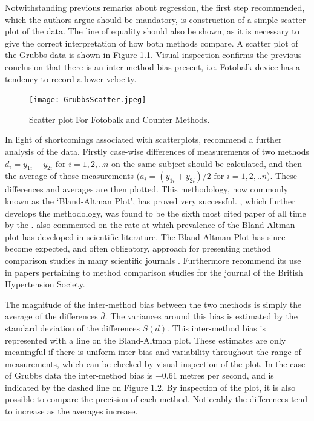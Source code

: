 \documentclass[12pt, a4paper]{report}
\begin{document}
Notwithstanding previous remarks about regression, the first step
recommended, which the authors argue should be mandatory, is
construction of a simple scatter plot of the data. The line of
equality should also be shown, as it is necessary to give the
correct interpretation of how both methods compare. A scatter plot
of the Grubbs data is shown in Figure 1.1. Visual inspection confirms the previous conclusion that there is an
inter-method bias present, i.e. Fotobalk device has a tendency to
record a lower velocity.

\begin{figure}[h!]
\begin{center}
  \texttt{[image: GrubbsScatter.jpeg]}
  \caption{Scatter plot For Fotobalk and Counter Methods.}\label{GrubbsScatter}
\end{center}
\end{figure}

In light of shortcomings associated with scatterplots,
\citet*{BA83} recommend a further analysis of the data. Firstly
case-wise differences of measurements of two methods $d_{i} =
y_{1i}-y_{2i} \mbox{ for }i=1,2,..n$ on the same subject should be
calculated, and then the average of those measurements ($a_{i} =
(y_{1i} + y_{2i})/2 \mbox{ for }i=1,2,..n$). These differences and
averages are then plotted. This methodology, now commonly known as
the `Bland-Altman Plot', has proved very successful.
\citet*{BA86}, which further develops the methodology, was found
to be the sixth most cited paper of all time by the
\citet{BAcite}. \cite{Dewitte} also commented on the rate at which
prevalence of the Bland-Altman plot has developed in scientific
literature. The Bland-Altman Plot has since become expected, and
often obligatory, approach for presenting method comparison
studies in many scientific journals \citep{hollis}. Furthermore
\citet{BritHypSoc} recommend its use in papers pertaining to
method comparison studies for the journal of the British
Hypertension Society.

The magnitude of the inter-method bias between the two methods is
simply the average of the differences $\bar{d}$. The variances
around this bias is estimated by the standard deviation of the
differences $S(d)$. This inter-method bias is represented with a
line on the Bland-Altman plot. These estimates are only meaningful
if there is uniform inter-bias and variability throughout the
range of measurements, which can be checked by visual inspection
of the plot. In the case of Grubbs data the inter-method bias is
$-0.61$ metres per second, and is indicated by the dashed line on
Figure 1.2. By inspection of the plot, it is also possible to
compare the precision of each method. Noticeably the differences
tend to increase as the averages increase.
\end{document}
